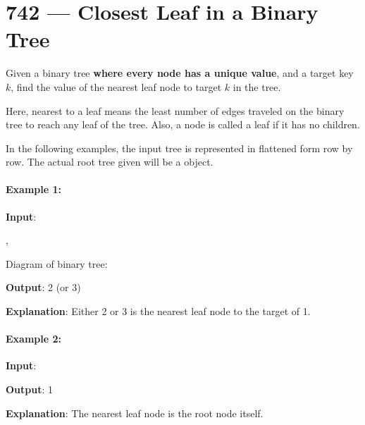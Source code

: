\section{742 --- Closest Leaf in a Binary Tree}
Given a binary tree \textbf{where every node has a unique value}, and a target key $k$, find the value of the nearest leaf node to target $k$ in the tree.

Here, nearest to a leaf means the least number of edges traveled on the binary tree to reach any leaf of the tree. Also, a node is called a leaf if it has no children.

In the following examples, the input tree is represented in flattened form row by row. The actual root tree given will be a  object.

\paragraph{Example 1:}
\begin{flushleft}


\textbf{Input}:

, 

Diagram of binary tree:

\begin{figure}[H]
\end{figure}

\textbf{Output}: 2 (or 3)

\textbf{Explanation}: Either 2 or 3 is the nearest leaf node to the target of 1.
\end{flushleft}

\paragraph{Example 2:}
\begin{flushleft}


\textbf{Input}:


\textbf{Output}: 1


\textbf{Explanation}: The nearest leaf node is the root node itself.
\end{flushleft}

